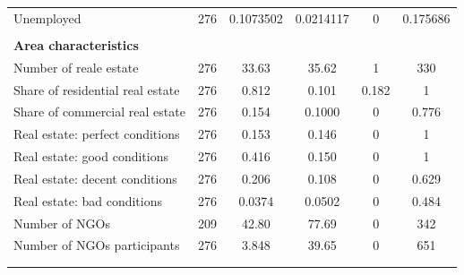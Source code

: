 \documentclass[12pt]{article}
\theoremstyle{plain}
\theoremstyle{plain}
\theoremstyle{plain}
\theoremstyle{definition}
\theoremstyle{plain}
\theoremstyle{definition}
\theoremstyle{plain}
\theoremstyle{remark}
\theoremstyle{definition}
\theoremstyle{definition}
\theoremstyle{plain}
\begin{document}
\begin{table}[H]
{\begin{tabular}{p{12.835em}lllll}
    \multicolumn{1}{l}{Unemployed} & \multicolumn{1}{c}{276} & \multicolumn{1}{c}{0.1073502} & \multicolumn{1}{c}{0.0214117} & \multicolumn{1}{c}{0} & \multicolumn{1}{c}{0.175686} \\
    \multicolumn{1}{r}{} &       &       &       &       &  \\
    \multicolumn{1}{l}{\textbf{Area characteristics}} &       &       &       &       &  \\
    \multicolumn{1}{l}{Number of reale estate} & \multicolumn{1}{c}{276} & \multicolumn{1}{c}{33.63} & \multicolumn{1}{c}{35.62} & \multicolumn{1}{c}{1} & \multicolumn{1}{c}{330} \\
    \multicolumn{1}{l}{Share of residential real estate} & \multicolumn{1}{c}{276} & \multicolumn{1}{c}{0.812} & \multicolumn{1}{c}{0.101} & \multicolumn{1}{c}{0.182} & \multicolumn{1}{c}{1} \\
    \multicolumn{1}{l}{Share of commercial real estate} & \multicolumn{1}{c}{276} & \multicolumn{1}{c}{0.154} & \multicolumn{1}{c}{0.1000} & \multicolumn{1}{c}{0} & \multicolumn{1}{c}{0.776} \\
    \multicolumn{1}{l}{Real estate: perfect conditions} & \multicolumn{1}{c}{276} & \multicolumn{1}{c}{0.153} & \multicolumn{1}{c}{0.146} & \multicolumn{1}{c}{0} & \multicolumn{1}{c}{1} \\
    \multicolumn{1}{l}{Real estate: good conditions} & \multicolumn{1}{c}{276} & \multicolumn{1}{c}{0.416} & \multicolumn{1}{c}{0.150} & \multicolumn{1}{c}{0} & \multicolumn{1}{c}{1} \\
    \multicolumn{1}{l}{Real estate: decent conditions} & \multicolumn{1}{c}{276} & \multicolumn{1}{c}{0.206} & \multicolumn{1}{c}{0.108} & \multicolumn{1}{c}{0} & \multicolumn{1}{c}{0.629} \\
    \multicolumn{1}{l}{Real estate: bad conditions} & \multicolumn{1}{c}{276} & \multicolumn{1}{c}{0.0374} & \multicolumn{1}{c}{0.0502} & \multicolumn{1}{c}{0} & \multicolumn{1}{c}{0.484} \\
    \multicolumn{1}{l}{Number of NGOs} & \multicolumn{1}{c}{209} & \multicolumn{1}{c}{42.80} & \multicolumn{1}{c}{77.69} & \multicolumn{1}{c}{0} & \multicolumn{1}{c}{342} \\
    \multicolumn{1}{l}{Number of NGOs participants} & \multicolumn{1}{c}{276} & \multicolumn{1}{c}{3.848} & \multicolumn{1}{c}{39.65} & \multicolumn{1}{c}{0} & \multicolumn{1}{c}{651} \\
    \multicolumn{1}{l}{} & \multicolumn{1}{c}{} & \multicolumn{1}{c}{} & \multicolumn{1}{c}{} & \multicolumn{1}{c}{} & \multicolumn{1}{c}{} \\
    \midrule
    \multicolumn{6}{p{37.835em}}{} \\
    \end{tabular}%
          }
    \end{table}
    
\end{document}
